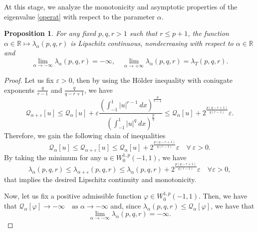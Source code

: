\documentclass{amsart}
\newtheorem{prop}[thm]{Proposition}
\theoremstyle{definition}
\theoremstyle{remark}
\newcommand{\R}{\mathbb{R}}
\newcommand{\eps}{\varepsilon}
\DeclareMathOperator{\dint}{\displaystyle\int}
\begin{document}
At this stage, we analyze the monotonicity and asymptotic properties of the eigenvalue \eqref{operat} with respect to the parameter $\alpha$.
\begin{prop}
\label{eig_prop}
For any fixed $p,q,r >1$ such that $r \le p+1$, the function $\alpha\in\R\mapsto\lambda_{\alpha}(p,q,r)$ is Lipschitz continuous, nondecreasing with respect to $\alpha\in\R$ and 
\[
\lim_{\alpha\to -\infty}\lambda_\alpha(p,q,r)=-\infty,\quad
\lim_{\alpha\to +\infty}\lambda_\alpha(p,q,r)=\lambda_T(p,q,r).
\]

\end{prop}
\begin{proof}
Let us fix $\varepsilon>0$, then by using the H\"older inequality with coniugate exponents $\frac q{r-1}$ and $\frac{q}{q-r+1}$, we have
\begin{equation*}
\mathcal{Q}_{\alpha+\eps} [u]\le\mathcal{Q}_\alpha[u]+\eps\frac{\left(\dint_{-1}^{1} |u|^{r-1}\  dx\right)^{\frac p{{r-1}}}}{\left(\dint_{-1}^{1} |u|^q\  dx\right)^\frac pq }\leq\mathcal{Q}_\alpha[u]+ 2^\frac{p(q-r+1)}{q(r-1)}\eps.
\end{equation*}
Therefore, we gain the following chain of inequalities
\begin{equation*}
\mathcal{Q}_\alpha[u]\leq\mathcal{Q}_{\alpha+\eps}[u]\le\mathcal{Q}_\alpha[u]+ 2^\frac{p(q-r+1)}{q(r-1)}\eps\quad\forall \ \varepsilon>0.
\end{equation*}
By taking the minimum for any $u\in W_0^{1,p}(-1,1)$, we have
\begin{equation*}
\lambda_\alpha (p,q,r)\leq\lambda_{\alpha+\varepsilon} (p,q,r)\leq\lambda_ \alpha (p,q,r)+2^\frac{p(q-r+1)}{q(r-1)}\varepsilon\quad\forall\varepsilon>0,
\end{equation*}
that implies the desired Lipschitz continuity and monotonicity. 

Now, let us fix a positive admissible function $\varphi\in W^{1,p}_0(-1,1)$. Then, we have that $\mathcal Q_{\alpha}[\varphi] \to -\infty \quad\text{as }\alpha\to -\infty$ and, since $\lambda_\alpha(p,q,r) \le \mathcal Q_{\alpha}[\varphi]$, we have that
\[
\lim_{\alpha\to -\infty}\lambda_\alpha(p,q,r)=-\infty.
\]


\end{proof}
\end{document}
